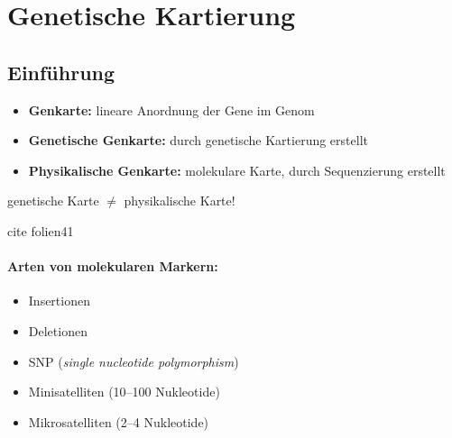 
\section{Genetische Kartierung}
\subsection{Einführung}

\begin{itemize}
    \item \textbf{Genkarte:} lineare Anordnung der Gene im Genom
    \item \textbf{Genetische Genkarte:} durch genetische Kartierung erstellt
    \item \textbf{Physikalische Genkarte:} molekulare Karte, durch Sequenzierung erstellt
\end{itemize}

\begin{center}
    genetische Karte $\neq$ physikalische Karte!
\end{center}
cite folien41


\paragraph{Arten von molekularen Markern:}
\begin{itemize}
    \item Insertionen
    \item Deletionen
    \item SNP (\textit{single nucleotide polymorphism})
    \item Minisatelliten (10--100 Nukleotide)
    \item Mikrosatelliten (2--4 Nukleotide)
\end{itemize}




